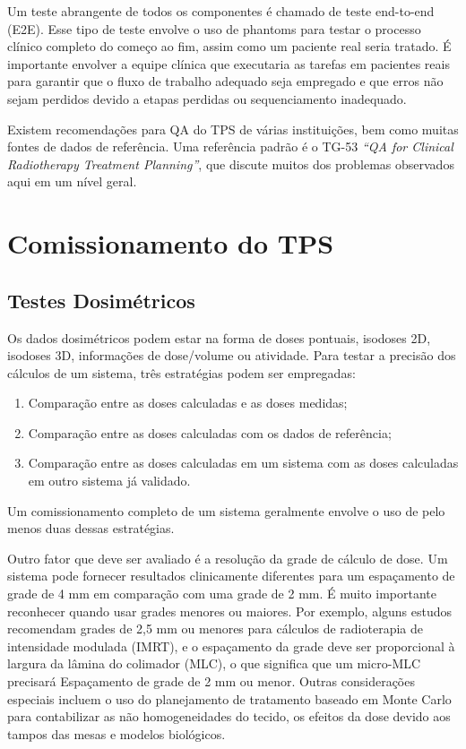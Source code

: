 \documentclass[11pt,a4paper]{article}
\newcounter{exemplo}
\begin{document}
	Um teste abrangente de todos os componentes é chamado de teste end-to-end (E2E). Esse tipo de teste envolve o uso de phantoms para testar o processo clínico completo do começo ao fim, assim como um paciente real seria tratado. É importante envolver a equipe clínica que executaria as tarefas em pacientes reais para garantir que o fluxo de trabalho adequado seja empregado e que erros não sejam perdidos devido a etapas perdidas ou sequenciamento inadequado.

	Existem recomendações para QA do TPS  de várias instituições, bem como muitas fontes de dados de referência. Uma referência padrão é o TG-53 \textit{``QA for Clinical Radiotherapy Treatment Planning''}, que discute muitos dos problemas observados aqui em um nível geral.

\section{Comissionamento do TPS}

\subsection*{Testes Dosimétricos}

	Os dados dosimétricos podem estar na forma de doses pontuais, isodoses 2D, isodoses 3D, informações de dose/volume ou atividade. Para testar a precisão dos cálculos de um sistema, três estratégias podem ser empregadas:

	\begin{enumerate}
		\item Comparação entre as doses calculadas e as doses medidas;
		\item Comparação entre as doses calculadas com os dados de referência;
		\item Comparação entre as doses calculadas em um sistema com as doses calculadas em outro sistema já validado.
	\end{enumerate}

	Um comissionamento completo de um sistema geralmente envolve o uso de pelo menos duas dessas estratégias.

	Outro fator que deve ser avaliado é a resolução da grade de cálculo de dose. Um sistema pode fornecer resultados clinicamente diferentes para um espaçamento de grade de 4 mm em comparação com uma grade de 2 mm. É muito importante reconhecer quando usar grades menores ou maiores. Por exemplo, alguns estudos recomendam grades de 2,5 mm ou menores para cálculos de radioterapia de intensidade modulada (IMRT), e o espaçamento da grade deve ser proporcional à largura da lâmina do colimador (MLC), o que significa que um micro-MLC precisará Espaçamento de grade de 2 mm ou menor. Outras considerações especiais incluem o uso do planejamento de tratamento baseado em Monte Carlo para contabilizar as não homogeneidades do tecido, os efeitos da dose devido aos tampos das mesas e modelos biológicos.
\end{document}
